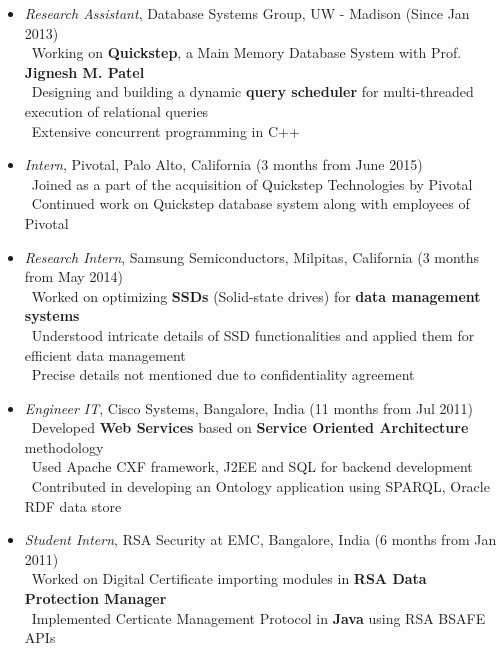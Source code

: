 \documentclass[11pt]{article}
\begin{document}
\begin{itemize}\addtolength{\itemsep}{-0.5\baselineskip}
	\item{\textit{Research Assistant}, Database Systems Group, UW - Madison \hfill (Since Jan 2013)}\\
		\textendash\ Working on \textbf{Quickstep}, a Main Memory Database System with Prof. \textbf{Jignesh M. Patel} \\
		\textendash\ Designing and building a dynamic \textbf{query scheduler} for multi-threaded execution of relational queries \\
		\textendash\ Extensive concurrent programming in C++\\
	\item{\textit{Intern}, Pivotal, Palo Alto, California \hfill (3 months from June 2015)}\\
	\textendash\ Joined as a part of the acquisition of Quickstep Technologies by Pivotal \\
	\textendash\ Continued work on Quickstep database system along with employees of Pivotal\\
	\item{\textit{Research Intern}, Samsung Semiconductors, Milpitas, California \hfill (3 months from May 2014)}\\
		\textendash\ Worked on optimizing \textbf{SSDs} (Solid-state drives) for \textbf{data management systems} \\
		\textendash\ Understood intricate details of SSD functionalities and applied them for efficient data management \\
		\textendash\ Precise details not mentioned due to confidentiality agreement\\
	\item{\textit{Engineer IT}, Cisco Systems, Bangalore, India \hfill (11 months from Jul 2011)}\\
		\textendash\ Developed \textbf{Web Services} based on \textbf{Service Oriented Architecture} methodology\\
		\textendash\ Used Apache CXF framework, J2EE and SQL for backend development\\
		\textendash\ Contributed in developing an Ontology application using SPARQL, Oracle RDF data store\\
	\item{\textit{Student Intern}, RSA Security at EMC, Bangalore, India \hfill (6 months from Jan 2011)}\\
		\textendash\ Worked on Digital Certificate importing modules in \textbf{RSA Data Protection Manager}\\
		\textendash\ Implemented Certicate Management Protocol in \textbf{Java} using RSA BSAFE APIs\\
\end{itemize}
\end{document}
